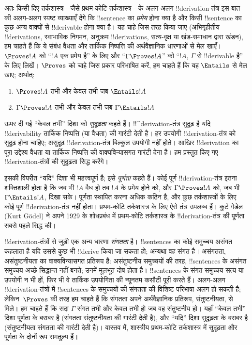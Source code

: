 \documentclass[../../../include/open-logic-section]{subfiles}
\begin{document}
अतः किसी दिए तर्कशास्त्र—जैसे प्रथम-कोटि तर्कशास्त्र—के अलग-अलग
!!{derivation}-तंत्र इस बात की अलग-अलग स्पष्ट व्याख्याएँ देंगे कि
!!{sentence} का \emph{प्रमेय} होना क्या है और किसी !!{sentence} का कुछ
अन्य वाक्यों से !!{derivable} होना क्या है। यह चाहे जिस तरह किया जाए
(अभिगृहीतीय !!{derivation}s, स्वाभाविक निगमन, अनुक्रम !!{derivation}s,
सत्य-वृक्ष या खंड-समाधान द्वारा खंडन), हम चाहते हैं कि ये संबंध वैधता और
तार्किक निष्पत्ति की अर्थवैज्ञानिक धारणाओं से मेल खाएँ। $\Proves !A$ को
``$!A$ एक प्रमेय है'' के लिए और ``$\Gamma \Proves !A$'' को ``$!A$,
$\Gamma$ से !!{derivable} है'' के लिए लिखें। $\Proves$ को चाहे जिस प्रकार
परिभाषित करें, हम चाहते हैं कि यह $\Entails$ से मेल खाए; अर्थात्:
\begin{enumerate}
\item $\Proves !A$ तभी और केवल तभी जब $\Entails !A$
\item $\Gamma \Proves !A$ तभी और केवल तभी जब $\Gamma \Entails !A$
\end{enumerate}
ऊपर दी गई ``केवल तभी'' दिशा को \emph{सुदृढ़ता} कहते हैं।
!!^{derivation}-तंत्र सुदृढ़ है यदि !!{derivability} तार्किक निष्पत्ति (या
वैधता) की गारंटी देती है। हर उपयोगी !!{derivation}-तंत्र को सुदृढ़ होना चाहिए;
असुदृढ़ !!{derivation}-तंत्र बिल्कुल उपयोगी नहीं होते। आखिर !!{derivation}
का पूरा उद्देश्य वैधता या तार्किक निष्पत्ति की वाक्यविन्यासगत गारंटी देना है।
हम प्रस्तुत किए गए !!{derivation}-तंत्रों की सुदृढ़ता सिद्ध करेंगे।

इसकी विपरीत ``यदि'' दिशा भी महत्त्वपूर्ण है; इसे \emph{पूर्णता} कहते हैं। कोई
पूर्ण !!{derivation}-तंत्र इतना शक्तिशाली होता है कि जब भी $!A$ वैध हो तब
$!A$ के प्रमेय होने को, और $\Gamma \Proves !A$ को, जब भी
$\Gamma \Entails !A$, दिखा सके। पूर्णता स्थापित करना अधिक कठिन है, और कुछ
तर्कशास्त्रों के लिए कोई पूर्ण !!{derivation}-तंत्र नहीं होता। प्रथम-कोटि
तर्कशास्त्र के लिए ऐसे तंत्र उपलब्ध हैं। कुर्ट गेडेल (Kurt G\"odel) ने अपने
1929 के शोधप्रबंध में
प्रथम-कोटि तर्कशास्त्र के !!{derivation}-तंत्र की पूर्णता सबसे पहले सिद्ध की।

!!{derivation}-तंत्रों से जुड़ी एक अन्य धारणा \emph{संगतता} है।
!!{sentence}s का कोई समुच्चय असंगत कहलाता है यदि उससे कुछ भी !!{derive} किया
जा सकता हो; अन्यथा वह संगत है। असंगतता, असंतुष्टनीयता का वाक्यविन्यासगत
प्रतिरूप है: असंतुष्टनीय समुच्चयों की तरह, !!{sentence}s के असंगत समुच्चय
अच्छे सिद्धान्त नहीं बनते; उनमें मूलभूत दोष होता है। !!{sentence}s के संगत
समुच्चय सत्य या उपयोगी न भी हों, फिर भी वे तार्किक उपयोगिता की न्यूनतम कसौटी
पूरी करते हैं। अलग-अलग !!{derivation}-तंत्रों में !!{sentence}s के
समुच्चयों की संगतता की विशिष्ट परिभाषा अलग हो सकती है; लेकिन~$\Proves$ की तरह
हम चाहते हैं कि संगतता अपने अर्थवैज्ञानिक प्रतिरूप, संतुष्टनीयता, से मिले। हम
चाहते हैं कि सदा $\Gamma$ संगत तभी और केवल तभी हो जब वह संतुष्टनीय हो। यहाँ
``केवल तभी'' दिशा पूर्णता के बराबर है (संगतता संतुष्टनीयता की गारंटी देती है),
और ``यदि'' दिशा सुदृढ़ता के बराबर है (संतुष्टनीयता संगतता की गारंटी देती है)।
वास्तव में, शास्त्रीय प्रथम-कोटि तर्कशास्त्र में सुदृढ़ता और पूर्णता के दोनों
रूप समतुल्य हैं।
\end{document}
